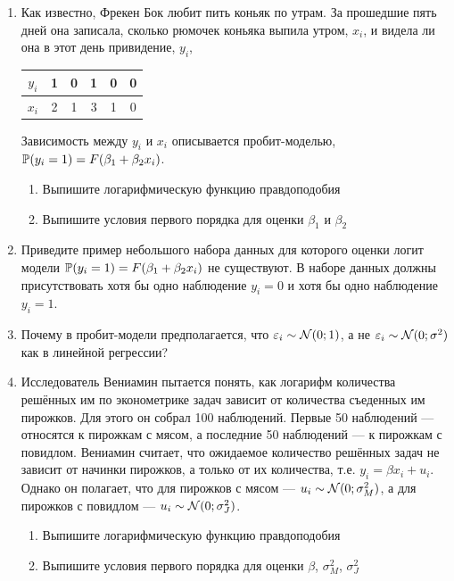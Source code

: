 \documentclass[12pt, a4paper]{article}\usepackage[]{graphicx}\usepackage[]{color}
\begin{document}
\begin{enumerate}
\thispagestyle{empty}

\item Как известно, Фрекен Бок любит пить коньяк по утрам. За прошедшие пять дней она записала, сколько рюмочек коньяка выпила утром, $x_i$, и видела ли она в этот день привидение, $y_i$,

\begin{tabular}{c|ccccc}
$y_i$ & 1 & 0 & 1 & 0 & 0 \\
\hline
$x_i$ & 2 & 1 & 3 & 1 & 0
\end{tabular}

Зависимость между $y_i$ и $x_i$ описывается пробит-моделью, $\P(y_i=1)=F(\beta_1 + \beta_2 x_i)$.

\begin{enumerate}
\item Выпишите логарифмическую функцию правдоподобия
\item Выпишите условия первого порядка для оценки $\beta_1$ и $\beta_2$
\end{enumerate}


\item Приведите пример небольшого набора данных для которого оценки логит модели $\P(y_i=1)=F(\beta_1 + \beta_2 x_i)$ не существуют. В наборе данных должны присутствовать хотя бы одно наблюдение $y_i=0$ и хотя бы одно наблюдение $y_i=1$.

\item Почему в пробит-модели предполагается, что $\e_i \sim \cN(0;1)$, а не $\e_i \sim \cN(0;\sigma^2)$ как в линейной регрессии?

\item Исследователь Вениамин пытается понять, как логарифм количества решённых им по эконометрике задач зависит от количества съеденных им пирожков. Для этого он собрал 100 наблюдений. Первые 50 наблюдений — относятся к пирожкам с мясом, а последние 50 наблюдений — к пирожкам с повидлом. Вениамин считает, что ожидаемое количество решённых задач не зависит от начинки пирожков, а только от их количества, т.е. $y_i = \beta x_i + u_i$. Однако он полагает, что для пирожков с мясом — $u_i\sim \cN(0;\sigma^2_M)$, а для пирожков с повидлом — $u_i\sim \cN(0;\sigma^2_J)$.

\begin{enumerate}
\item Выпишите логарифмическую функцию правдоподобия
\item Выпишите условия первого порядка для оценки $\beta$, $\sigma^2_M$, $\sigma^2_J$
\end{enumerate}


\end{enumerate}
\end{document}
